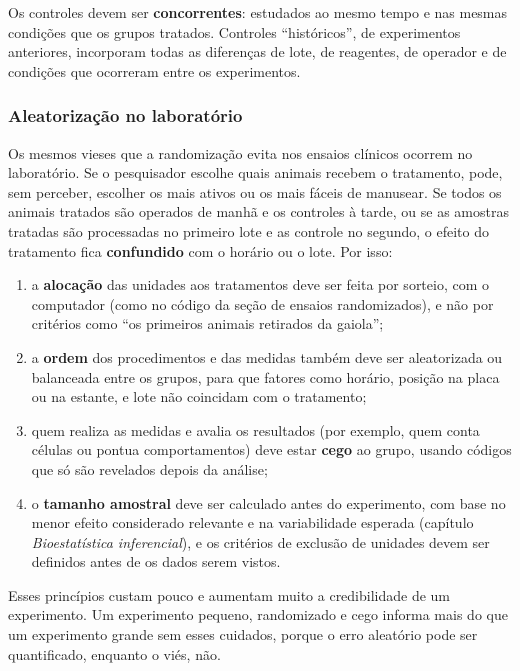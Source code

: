 \documentclass[
]{book}
\providecommand{\tightlist}{%
  \setlength{\itemsep}{0pt}\setlength{\parskip}{0pt}}
\begin{document}
Os controles devem ser \textbf{concorrentes}: estudados ao mesmo tempo e nas mesmas condições que os grupos tratados. Controles ``históricos'', de experimentos anteriores, incorporam todas as diferenças de lote, de reagentes, de operador e de condições que ocorreram entre os experimentos.

\subsubsection{Aleatorização no laboratório}\label{aleatorizauxe7uxe3o-no-laboratuxf3rio}

Os mesmos vieses que a randomização evita nos ensaios clínicos ocorrem no laboratório. Se o pesquisador escolhe quais animais recebem o tratamento, pode, sem perceber, escolher os mais ativos ou os mais fáceis de manusear. Se todos os animais tratados são operados de manhã e os controles à tarde, ou se as amostras tratadas são processadas no primeiro lote e as controle no segundo, o efeito do tratamento fica \textbf{confundido} com o horário ou o lote. Por isso:

\begin{enumerate}
\def\labelenumi{\arabic{enumi}.}
\tightlist
\item
  a \textbf{alocação} das unidades aos tratamentos deve ser feita por sorteio, com o computador (como no código da seção de ensaios randomizados), e não por critérios como ``os primeiros animais retirados da gaiola'';
\item
  a \textbf{ordem} dos procedimentos e das medidas também deve ser aleatorizada ou balanceada entre os grupos, para que fatores como horário, posição na placa ou na estante, e lote não coincidam com o tratamento;
\item
  quem realiza as medidas e avalia os resultados (por exemplo, quem conta células ou pontua comportamentos) deve estar \textbf{cego} ao grupo, usando códigos que só são revelados depois da análise;
\item
  o \textbf{tamanho amostral} deve ser calculado antes do experimento, com base no menor efeito considerado relevante e na variabilidade esperada (capítulo \emph{Bioestatística inferencial}), e os critérios de exclusão de unidades devem ser definidos antes de os dados serem vistos.
\end{enumerate}

Esses princípios custam pouco e aumentam muito a credibilidade de um experimento. Um experimento pequeno, randomizado e cego informa mais do que um experimento grande sem esses cuidados, porque o erro aleatório pode ser quantificado, enquanto o viés, não.
\end{document}
